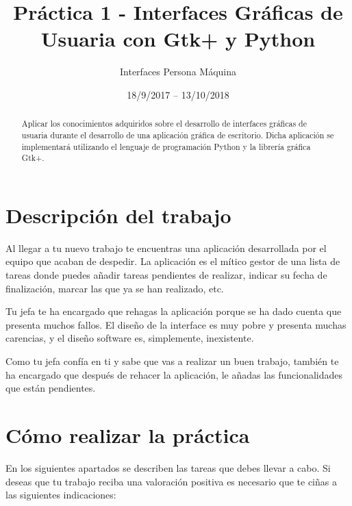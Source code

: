 \documentclass[11pt,a4paper]{article}
\title{Práctica 1 - Interfaces Gráficas de Usuaria con Gtk+ y Python}
\author{Interfaces Persona Máquina}
\date{18/9/2017 -- 13/10/2018}
\begin{document}
\maketitle

\renewcommand{\abstractname}{Objetivos}
\begin{abstract}
  Aplicar los conocimientos adquiridos sobre el desarrollo de
  interfaces gráficas de usuaria durante el desarrollo de una
  aplicación gráfica de escritorio. Dicha aplicación se implementará
  utilizando el lenguaje de programación Python y la librería gráfica
  Gtk+.
\end{abstract}


\section{Descripción del trabajo}

Al llegar a tu nuevo trabajo te encuentras una aplicación desarrollada
por el equipo que acaban de despedir. La aplicación es el mítico
gestor de una lista de tareas donde puedes añadir tareas pendientes de
realizar, indicar su fecha de finalización, marcar las que ya se han
realizado, etc.

Tu jefa te ha encargado que rehagas la aplicación porque se ha dado
cuenta que presenta muchos fallos. El diseño de la interface es muy
pobre y presenta muchas carencias, y el diseño software es,
simplemente, inexistente.

Como tu jefa confía en ti y sabe que vas a realizar un buen trabajo,
también te ha encargado que después de rehacer la aplicación, le
añadas las funcionalidades que están pendientes.

\section{Cómo realizar la práctica}
\label{sec:como-realizar}

En los siguientes apartados se describen las tareas que debes llevar a
cabo. Si deseas que tu trabajo reciba una valoración positiva es
necesario que te ciñas a las siguientes indicaciones:
\end{document}

